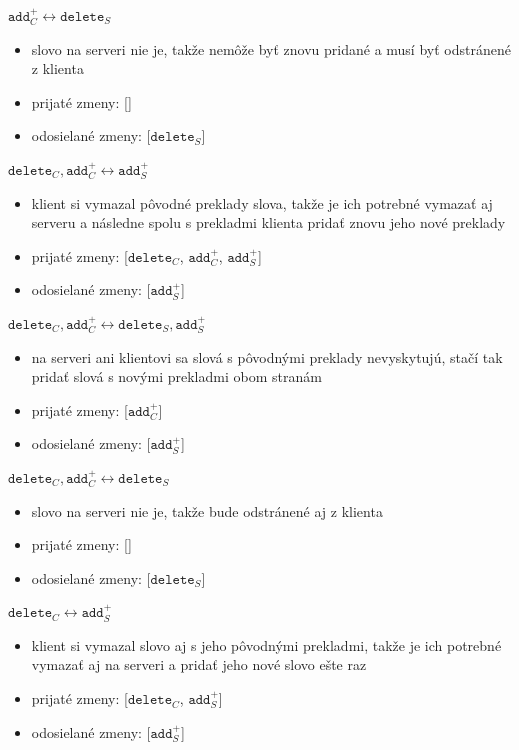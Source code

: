 \documentclass[
  digital, %
  table,   %
  lof,     %
  lot,     %
]{fithesis3}
\begin{document}
\noindent
$\texttt{add}_{C}^+ \longleftrightarrow \texttt{delete}_{S}$
\begin{itemize}
\item slovo na serveri nie je, takže nemôže byť znovu pridané a musí byť odstránené z klienta
\item prijaté zmeny: []
\item odosielané zmeny: [$\texttt{delete}_{S}$]
\end{itemize}
\noindent
$\texttt{delete}_{C}, \texttt{add}_{C}^+ \longleftrightarrow \texttt{add}_{S}^+$
\begin{itemize}
\item klient si vymazal pôvodné preklady slova, takže je ich potrebné vymazať aj serveru a následne spolu s prekladmi klienta pridať znovu jeho nové preklady
\item prijaté zmeny: [$\texttt{delete}_{C}$, $\texttt{add}_{C}^+$, $\texttt{add}_{S}^+$]
\item odosielané zmeny: [$\texttt{add}_{S}^+$]
\end{itemize}

\noindent
$\texttt{delete}_{C}, \texttt{add}_{C}^+ \longleftrightarrow \texttt{delete}_{S}, \texttt{add}_{S}^+$
\begin{itemize}
\item na serveri ani klientovi sa slová s pôvodnými preklady nevyskytujú, stačí tak pridať slová s novými prekladmi obom stranám
\item prijaté zmeny: [$\texttt{add}_{C}^+$]
\item odosielané zmeny: [$\texttt{add}_{S}^+$]
\end{itemize}

\noindent
$\texttt{delete}_{C}, \texttt{add}_{C}^+ \longleftrightarrow \texttt{delete}_{S}$
\begin{itemize}
\item slovo na serveri nie je, takže bude odstránené aj z klienta
\item prijaté zmeny: []
\item odosielané zmeny: [$\texttt{delete}_{S}$]
\end{itemize}
\noindent
$\texttt{delete}_{C} \longleftrightarrow \texttt{add}_{S}^+$
\begin{itemize}
\item klient si vymazal slovo aj s jeho pôvodnými prekladmi, takže je ich potrebné vymazať aj na serveri a pridať jeho nové slovo ešte raz
\item prijaté zmeny: [$\texttt{delete}_{C}$, $\texttt{add}_{S}^+$]
\item odosielané zmeny: [$\texttt{add}_{S}^+$]
\end{itemize}
\end{document}
